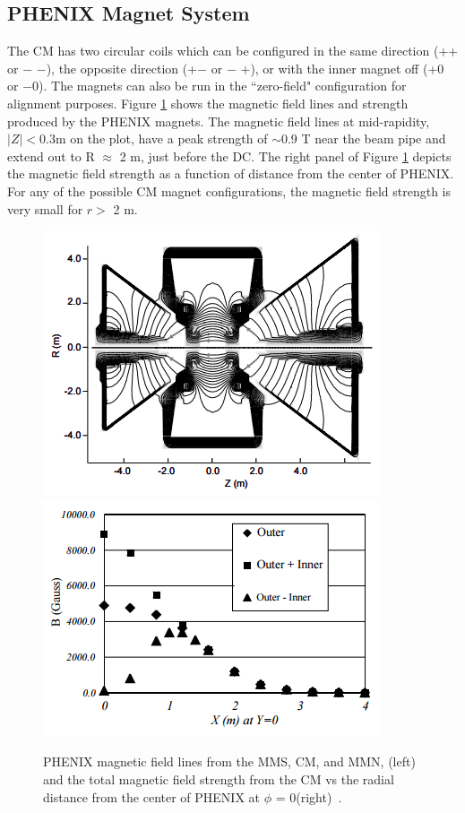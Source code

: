 \subsection{PHENIX Magnet System}
 The CM has two circular coils which can be configured in the same direction (++ or $-$ $-$), the opposite direction (+$-$ or $-$ $+$), or with the inner magnet off (+0 or $-$0). The magnets can also be run in the ``zero-field" configuration for alignment purposes. Figure \ref{fig:magnet_figures} shows the magnetic field lines and strength produced by the PHENIX magnets. The magnetic field lines at mid-rapidity, $|Z| < 0.3$m on the plot, have a peak strength of $\sim$0.9 T near the beam pipe and extend out to R $\approx$ 2 m, just before the DC. The right panel of Figure \ref{fig:magnet_figures} depicts the magnetic field strength as a function of distance from the center of PHENIX. For any of the possible CM magnet configurations, the magnetic field strength is very small for $r > $ 2 m.
\begin{figure}[!ht]
\centering
\includegraphics[width=0.45\linewidth]{figs/magnet_map.png}
\includegraphics[width=0.45\linewidth]{figs/magnetic_field_strength.png}
\caption{PHENIX magnetic field lines from the MMS, CM, and MMN, (left) and the total magnetic field strength from the CM vs the radial distance from the center of PHENIX at $\phi$ = 0(right)~\cite{Aronson2003480}.}
\label{fig:magnet_figures}
\end{figure}
